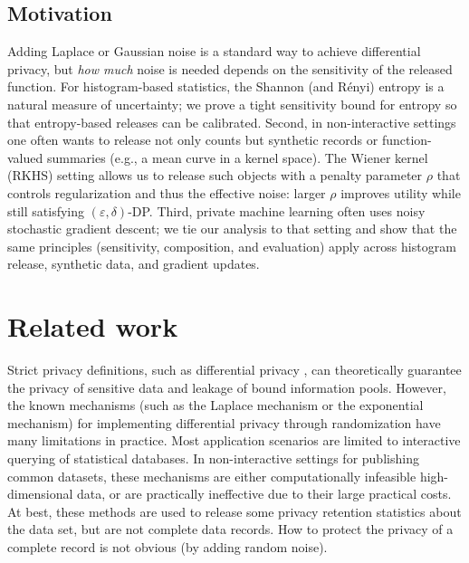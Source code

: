 \documentclass[journal,transmag]{IEEEtran}
\begin{document}
\subsection{Motivation}
Adding Laplace or Gaussian noise is a standard way to achieve differential privacy, but \emph{how much} noise is needed depends on the sensitivity of the released function. For histogram-based statistics, the Shannon (and R\'enyi) entropy is a natural measure of uncertainty; we prove a tight sensitivity bound for entropy so that entropy-based releases can be calibrated. Second, in non-interactive settings one often wants to release not only counts but synthetic records or function-valued summaries (e.g., a mean curve in a kernel space). The Wiener kernel (RKHS) setting allows us to release such objects with a penalty parameter $\rho$ that controls regularization and thus the effective noise: larger $\rho$ improves utility while still satisfying $(\varepsilon,\delta)$-DP. Third, private machine learning often uses noisy stochastic gradient descent; we tie our analysis to that setting and show that the same principles (sensitivity, composition, and evaluation) apply across histogram release, synthetic data, and gradient updates.

\section{Related work}
Strict privacy definitions, such as differential privacy \cite{dwork2006differential}, can theoretically guarantee the privacy of sensitive
data and leakage of bound information pools. However, the known mechanisms (such as the Laplace mechanism or the exponential mechanism) for implementing differential privacy through randomization have many limitations in practice.
Most application scenarios are limited to interactive querying of statistical databases. In non-interactive settings for publishing common datasets, these mechanisms are either computationally infeasible high-dimensional data, or are practically ineffective due to their large practical costs. At best, these methods are used to release some privacy retention statistics about the data set, but are not complete data records. How to protect the privacy of a complete record is not obvious (by adding random noise).
\end{document}
